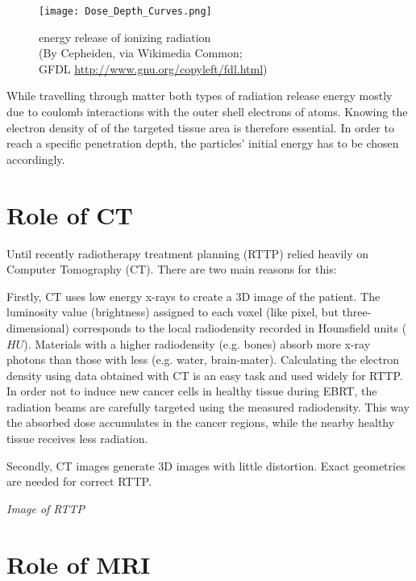 \begin{figure}[!h]
	\centering
	\texttt{[image: Dose\_Depth\_Curves.png]}
	\caption{energy release of ionizing radiation \\(By Cepheiden, via Wikimedia Common;\\ GFDL \url{http://www.gnu.org/copyleft/fdl.html})}
	\label{fig:bragg}
\end{figure}

While travelling through matter both types of radiation release energy mostly due to coulomb interactions with the outer shell electrons of atoms.
Knowing the electron density of of the targeted tissue area is therefore essential. In order to reach a specific penetration depth, the particles' initial energy has to be chosen accordingly.

\section{Role of CT}

Until recently radiotherapy treatment planning (RTTP) relied heavily on Computer Tomography (CT). There are two main reasons for this:

Firstly, CT uses low energy x-rays to create a 3D image of the patient. The luminosity value (brightness) assigned to each voxel (like pixel, but three-dimensional) corresponds to
the local radiodensity recorded in Hounsfield units ($HU$). Materials with a higher radiodensity (e.g. bones) absorb more x-ray photons than those with less (e.g. water, brain-mater).
Calculating the electron density using data obtained with CT is an easy task and used widely for RTTP. \cite{Constantinou2012, Schneider1996}
In order not to induce new cancer cells in healthy tissue during EBRT, the radiation beams are carefully targeted using the measured radiodensity. 
This way the absorbed dose accumulates in the cancer regions, while the nearby healthy tissue receives less radiation.

Secondly, CT images generate 3D images with little distortion. Exact geometries are needed for correct RTTP. %

\vspace{4cm}
\textit{Image of RTTP}
\vspace{2cm}

\section{Role of MRI}

